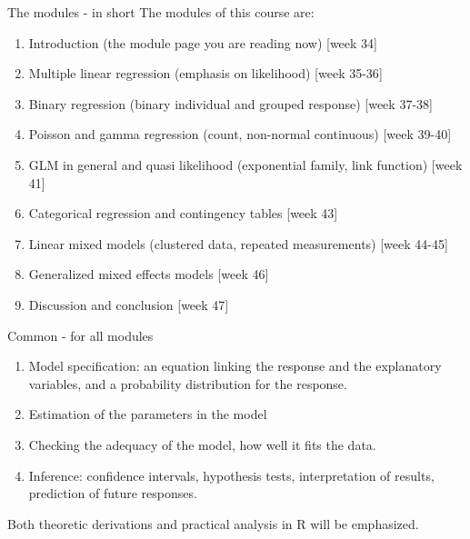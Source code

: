 \documentclass[
  ignorenonframetext,
]{beamer}
\begin{document}
\begin{frame}
\begin{block}{The modules - in short}
\protect\hypertarget{the-modules---in-short}{}
The modules of this course are:

\begin{enumerate}
\item
  Introduction (the module page you are reading now) {[}week 34{]}
\item
  Multiple linear regression (emphasis on likelihood) {[}week 35-36{]}
\item
  Binary regression (binary individual and grouped response) {[}week
  37-38{]}
\item
  Poisson and gamma regression (count, non-normal continuous) {[}week
  39-40{]}
\item
  GLM in general and quasi likelihood (exponential family, link
  function) {[}week 41{]}
\item
  Categorical regression and contingency tables {[}week 43{]}
\item
  Linear mixed models (clustered data, repeated measurements) {[}week
  44-45{]}
\item
  Generalized mixed effects models {[}week 46{]}
\item
  Discussion and conclusion {[}week 47{]}
\end{enumerate}
\end{block}
\end{frame}

\begin{frame}
\begin{block}{Common - for all modules}
\protect\hypertarget{common---for-all-modules}{}
\begin{enumerate}
\item
  Model specification: an equation linking the response and the
  explanatory variables, and a probability distribution for the
  response.
\item
  Estimation of the parameters in the model
\item
  Checking the adequacy of the model, how well it fits the data.
\item
  Inference: confidence intervals, hypothesis tests, interpretation of
  results, prediction of future responses.
\end{enumerate}

Both theoretic derivations and practical analysis in R will be
emphasized.
\end{block}
\end{frame}
\end{document}

